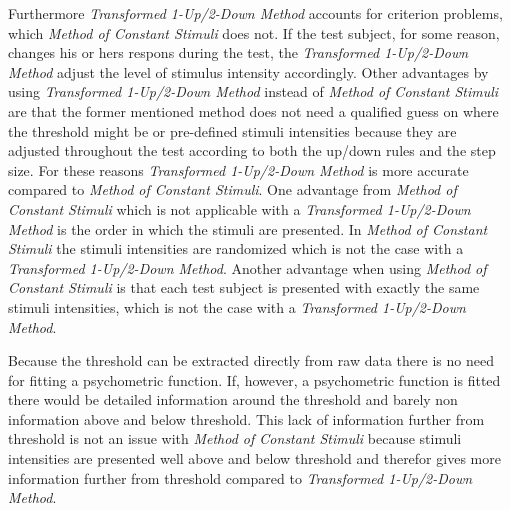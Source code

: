 Furthermore \textit{Transformed 1-Up/2-Down Method} accounts for criterion problems, which \textit{Method of Constant Stimuli} does not. If the test subject, for some reason, changes his or hers respons during the test, the \textit{Transformed 1-Up/2-Down Method} adjust the level of stimulus intensity accordingly. Other advantages by using \textit{Transformed 1-Up/2-Down Method} instead of \textit{Method of Constant Stimuli} are that the former mentioned method does not need a qualified guess on where the threshold might be or pre-defined stimuli intensities because they are adjusted throughout the test according to both the up/down rules and the step size. For these reasons \textit{Transformed 1-Up/2-Down Method} is more accurate compared to \textit{Method of Constant Stimuli}.\blankline
%
One advantage from \textit{Method of Constant Stimuli} which is not applicable with a \textit{Transformed 1-Up/2-Down Method} is the order in which the stimuli are presented. In \textit{Method of Constant Stimuli} the stimuli intensities are randomized which is not the case with a \textit{Transformed 1-Up/2-Down Method}. Another advantage when using \textit{Method of Constant Stimuli} is that each test subject is presented with exactly the same stimuli intensities, which is not the case with a \textit{Transformed 1-Up/2-Down Method}. 

Because the threshold can be extracted directly from raw data there is no need for fitting a psychometric function. If, however, a psychometric function is fitted there would be detailed information around the threshold and barely non information above and below threshold. This lack of information further from threshold is not an issue with \textit{Method of Constant Stimuli} because stimuli intensities are presented well above and below threshold and therefor gives more information further from threshold compared to \textit{Transformed 1-Up/2-Down Method}.      

